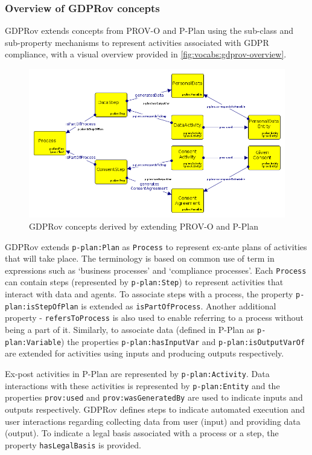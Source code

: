 \subsubsection{Overview of GDPRov concepts}
GDPRov extends concepts from PROV-O and P-Plan using the sub-class and sub-property mechanisms to represent activities associated with GDPR compliance, with a visual overview provided in \autoref{fig:vocabs:gdprov-overview}.
\begin{figure}[htbp]
    \centering
    \includegraphics[width=\linewidth]{img/GDProv_relation_prov_pplan.png}
    \caption{GDPRov concepts derived by extending PROV-O and P-Plan}
    \label{fig:vocabs:gdprov-overview}
\end{figure}

GDPRov extends \texttt{p-plan:Plan} as \texttt{Process} to represent ex-ante plans of activities that will take place. The terminology is based on common use of term in expressions such as `business processes' and `compliance processes'.
Each \texttt{Process} can contain steps (represented by \texttt{p-plan:Step}) to represent activities that interact with data and agents.
To associate steps with a process, the property \texttt{p-plan:isStepOfPlan} is extended as \texttt{isPartOfProcess}.
Another additional property - \texttt{refersToProcess} is also used to enable referring to a process without being a part of it.
Similarly, to associate data (defined in P-Plan as \texttt{p-plan:Variable}) the properties \texttt{p-plan:hasInputVar} and \texttt{p-plan:isOutputVarOf} are extended for activities using inputs and producing outputs respectively.

Ex-post activities in P-Plan are represented by \texttt{p-plan:Activity}.
Data interactions with these activities is represented by \texttt{p-plan:Entity} and the properties \texttt{prov:used} and \texttt{prov:wasGeneratedBy} are used to indicate inputs and outputs respectively.
GDPRov defines steps to indicate automated execution and user interactions regarding collecting data from user (input) and providing data (output).
To indicate a legal basis associated with a process or a step, the property \texttt{hasLegalBasis} is provided.

